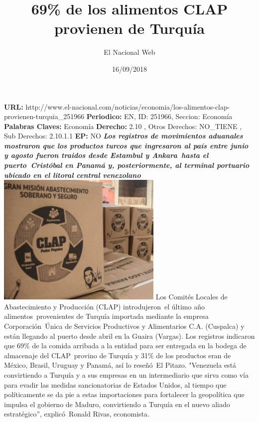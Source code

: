\documentclass{article}%
\title{\textbf{69\% de los alimentos CLAP provienen de Turquía}}%
\author{El Nacional Web}%
\date{16/09/2018}%
\begin{document}
%
\normalsize%
\maketitle%
\textbf{URL: }%
http://www.el{-}nacional.com/noticias/economia/los{-}alimentos{-}clap{-}provienen{-}turquia\_251966\newline%
%
\textbf{Periodico: }%
EN, %
ID: %
251966, %
Seccion: %
Economía\newline%
%
\textbf{Palabras Claves: }%
Economía\newline%
%
\textbf{Derecho: }%
2.10%
, Otros Derechos: %
NO\_TIENE%
, Sub Derechos: %
2.10.1.1%
\newline%
%
\textbf{EP: }%
NO\newline%
\newline%
%
\textbf{\textit{Los registros de movimientos aduanales mostraron que los productos turcos que ingresaron al país entre junio y agosto fueron traidos desde Estambul y Ankara~hasta el puerto~Cristóbal en Panamá y, posteriormente, al terminal portuario ubicado en el litoral central venezolano}}%
\newline%
\newline%
%
\includegraphics[width=300px]{21.jpg}%
\newline%
%
Los Comités Locales de Abastecimiento y Producción (CLAP) introdujeron~el último año alimentos~provenientes de Turquía importada mediante la empresa Corporación~Única de Servicios Productivos y Alimentarios C.A. (Cuspalca) y están llegando al puerto desde abril en la Guaira (Vargas).%
\newline%
%
Los registros indicaron que 69\% de la comida arribada a la entidad para ser entregada en la bodega de almacenaje del CLAP~provino de Turquía y 31\% de los productos eran de México, Brasil, Uruguay y Panamá, así lo reseñó~El Pitazo.%
\newline%
%
"Venezuela está convirtiendo a Turquía y a sus empresas en un intermediario que sirva como vía para evadir las medidas sancionatorias de Estados Unidos, al tiempo que políticamente se da pie a estas importaciones para fortalecer la geopolítica que impulsa el gobierno de Maduro, convirtiendo a Turquía en el nuevo aliado estratégico”, explicó~Ronald Rivas, economista.%
\end{document}
